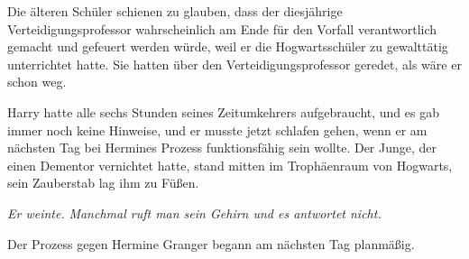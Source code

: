 Die älteren Schüler schienen zu glauben, dass der diesjährige
Verteidigungsprofessor wahrscheinlich am Ende für den Vorfall verantwortlich
gemacht und gefeuert werden würde, weil er die Hogwartsschüler zu gewalttätig
unterrichtet hatte. Sie hatten über den Verteidigungsprofessor geredet, als wäre
er schon weg.

Harry hatte alle sechs Stunden seines Zeitumkehrers aufgebraucht, und es gab
immer noch keine Hinweise, und er musste jetzt schlafen gehen, wenn er am
nächsten Tag bei Hermines Prozess funktionsfähig sein wollte. Der Junge, der
einen Dementor vernichtet hatte, stand mitten im Trophäenraum von Hogwarts, sein
Zauberstab lag ihm zu Füßen.

\emph{Er weinte.}
\emph{Manchmal ruft man sein Gehirn und es antwortet nicht.}

Der Prozess gegen Hermine Granger
begann am nächsten Tag planmäßig.

